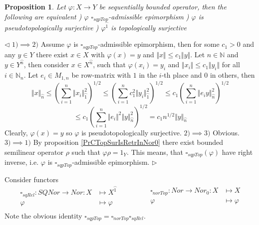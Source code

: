 \documentclass[12pt]{article}
\newtheorem{proposition}[theorem]{Proposition}
\newenvironment{proof}{\par $\triangleleft$}{$\triangleright$}
\begin{document}
\begin{proposition}\label{PrDecsPsTopAdmEpiMorph} Let $\varphi:X\to Y$ be sequentially bounded operator, then the following are equivalent
) $\varphi$ $\square_{sqpTop}$-admissible epimorphism
) $\varphi$ is pseudotopologically surjective
) $\varphi^{\wideparen{1}}$ is topologically surjective
\end{proposition}
\begin{proof}
$1)\implies 2)$ Assume $\varphi$ is $\square_{sqpTop}$-admissible epimorphism, then for some $c_1>0$ and any $y\in Y$ there exist $x\in X$ with $\varphi(x)=y$ and $\Vert x\Vert\leq c_1\Vert y\Vert$. Let $n\in\mathbb{N}$ and $y\in Y^{\wideparen{n}}$, then consider $x\in X^{\wideparen{n}}$, such that $\varphi(x_i)=y_i$ and $\Vert x_i\Vert\leq c_1\Vert y_i\Vert$ for all $i\in\mathbb{N}_n$. Let $e_i\in M_{1,n}$ be row-matrix with $1$ in the $i$-th place and $0$ in others, then 
$$
\Vert x\Vert_{\wideparen{n}}
\leq  \left(\sum\limits_{i=1}^n\Vert x_i\Vert_{\wideparen{1}}^2\right)^{1/2}
\leq  \left(\sum\limits_{i=1}^n c_1^2\Vert y_i\Vert_{\wideparen{1}}^2\right)^{1/2}
\leq c_1\left(\sum\limits_{i=1}^n\Vert e_i y\Vert_{\wideparen{n}}^2\right)^{1/2}
$$
$$
\leq c_1\left(\sum\limits_{i=1}^n\Vert e_i\Vert^2 \Vert y\Vert_{\wideparen{n}}^2\right)^{1/2}
=c_1n^{1/2}\Vert y\Vert_{\wideparen{n}}
$$
Clearly, $\varphi(x)=y$ so $\varphi$ is pseudotopologically surjective.
\newline
$2)\implies 3)$ Obvious.
\newline
$3)\implies 1)$ By proposition \ref{PrCTopSurIsRetrInNor0} there exist bounded semilinear operator $\rho$ such that $\varphi\rho=1_Y$. This means, that $\square_{sqpTop}(\varphi)$ have right inverse, i.e. $\varphi$ is $\square_{sqpTop}$-admissible epimorphism. 
\end{proof}

Consider functors
$$
\begin{aligned}
\square_{sqRel} : SQNor \to Nor: X &\mapsto X^{\wideparen{1}}\\
\varphi&\mapsto\varphi\\
\end{aligned}
\qquad\qquad
\begin{aligned}
\square_{norTop} : Nor \to Nor_0: X &\mapsto X\\
\varphi&\mapsto\varphi\\
\end{aligned}
$$
Note the obvious identity $\square_{sqpTop}=\square_{norTop}\square_{sqRel}$.
\end{document}
